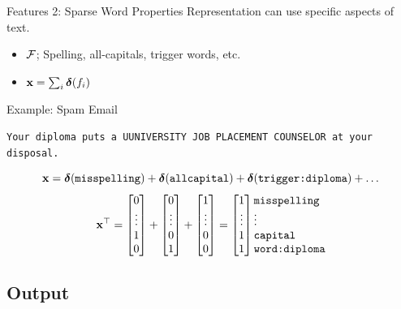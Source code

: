 \documentclass{beamer}
\begin{document}
\begin{frame}{Features 2: Sparse Word Properties}
  Representation can use specific aspects of text.
  \begin{itemize}
  \item $\mathcal{F}$; Spelling, all-capitals, trigger words, etc. 
  \item $\mathbf{x} = \sum_{i} \boldsymbol{\delta}(f_i)$ 
  \end{itemize}

  Example: Spam Email

  \begin{center}
    \texttt{Your diploma puts a UUNIVERSITY JOB PLACEMENT COUNSELOR at
      your disposal.}
  \end{center}
  \[  \mathbf{x} = \boldsymbol{\delta}(\texttt{misspelling}) + \boldsymbol{\delta}(\texttt{allcapital}) + \boldsymbol{\delta}(\texttt{trigger:diploma}) + \ldots\]
  \[
  \boldx^\top = 
 \begin{bmatrix} 0 \\ \vdots \\ 1\\  0 \\  \end{bmatrix} + 
 \begin{bmatrix} 0 \\ \vdots \\ 0\\ 1 \\  \end{bmatrix} +
 \begin{bmatrix} 1 \\ \vdots \\ 0\\  0 \\  \end{bmatrix} = 
 \begin{bmatrix} 1 \\ \vdots \\ 1 \\ 1 \\  \end{bmatrix}     \begin{matrix*}[l] \mathrm{\texttt{misspelling}} \\ \vdots \\ \mathrm{\texttt{capital}} \\ \mathrm{\texttt{word:diploma}} \\ \end{matrix*}
  \]
\end{frame}

\subsection{Output}
\end{document}
